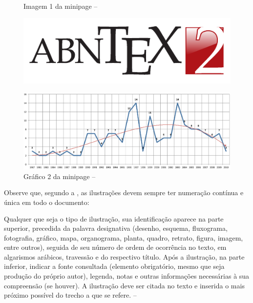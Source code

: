 \begin{figure}[htb]
    \label{teste}
    \centering
    \begin{minipage}{0.49\textwidth}
        \caption[Imagem 1 da minipage]{Imagem 1 da minipage -- \showfont}
        \label{fig_minipage_imagem1}
        \centering
        \includegraphics[width=\textwidth]{pictures/abntex2-modelo-img-marca.pdf}
    \end{minipage}
    \hfill
    \begin{minipage}{0.49\textwidth}
        \caption[Gráfico 2 da minipage]{Gráfico 2 da minipage -- \showfont}
        \label{fig_minipage_grafico2}
        \centering
        \includegraphics[width=\textwidth]{pictures/abntex2-modelo-img-grafico.pdf}
    \end{minipage}
\end{figure}



Observe que, segundo a \textcite[seções 4.2.1.10 e 5.8]{NBR14724:2011}, as
ilustrações devem sempre ter numeração contínua e única em todo o documento:

\begin{citacao}
    Qualquer que seja o tipo de ilustração, sua identificação aparece na parte
    superior, precedida da palavra designativa (desenho, esquema, fluxograma,
    fotografia, gráfico, mapa, organograma, planta, quadro, retrato, figura,
    imagem, entre outros), seguida de seu número de ordem de ocorrência no texto,
    em algarismos arábicos, travessão e do respectivo título. Após a ilustração, na
    parte inferior, indicar a fonte consultada (elemento obrigatório, mesmo que
    seja produção do próprio autor), legenda, notas e outras informações
    necessárias à sua compreensão (se houver). A ilustração deve ser citada no
    texto e inserida o mais próximo possível do trecho a que se
    refere. \cite[seções 5.8]{NBR14724:2011} -- \showfont
\end{citacao}

